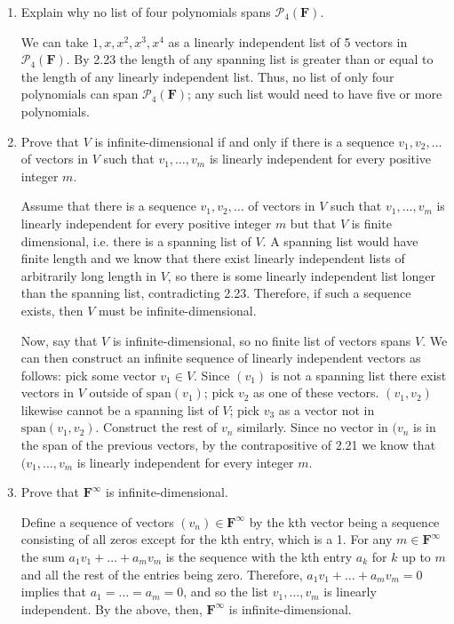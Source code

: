 \documentclass{book}
\begin{document}
\begin{enumerate}
\item Explain why no list of four polynomials spans \(\mathcal{P}_4(\textbf{F})\).

We can take \(1,x,x^2,x^3,x^4\) as a linearly independent list of 5 vectors in \(\mathcal{P}_4(\textbf{F})\).  By 2.23 the length of any spanning list is greater than or equal to the length of any linearly independent list.  Thus, no list of only four polynomials can span \(\mathcal{P}_4(\textbf{F})\); any such list would need to have five or more polynomials.

\item Prove that \(V\) is infinite-dimensional if and only if there is a sequence \(v_1,v_2,\dots\) of vectors in \(V\) such that \(v_1,\dots,v_m\) is linearly independent for every positive integer \(m\).

Assume that there is a sequence \(v_1,v_2,\dots\) of vectors in \(V\) such that \(v_1,\dots,v_m\) is linearly independent for every positive integer \(m\) but that \(V\) is finite dimensional, i.e. there is a spanning list of \(V\).  A spanning list would have finite length and we know that there exist linearly independent lists of arbitrarily long length in \(V\), so there is some linearly independent list longer than the spanning list, contradicting 2.23.  Therefore, if such a sequence exists, then \(V\) must be infinite-dimensional.

Now, say that \(V\) is infinite-dimensional, so no finite list of vectors spans \(V\).  We can then construct an infinite sequence of linearly independent vectors as follows: pick some vector \(v_1 \in V\).  Since \((v_1)\) is not a spanning list there exist vectors in \(V\) outside of \(\textrm{span}(v_1)\); pick \(v_2\) as one of these vectors.  \((v_1,v_2)\) likewise cannot be a spanning list of \(V\); pick \(v_3\) as a vector not in \(\textrm{span}(v_1,v_2)\).  Construct the rest of \(v_n\) similarly.  Since no vector in \((v_n\) is in the span of the previous vectors, by the contrapositive of 2.21 we know that \((v_1,\dots,v_m\) is linearly independent for every integer \(m\).

\item Prove that \(\textbf{F}^{\infty}\) is infinite-dimensional.

Define a sequence of vectors \((v_n) \in \textbf{F}^{\infty}\) by the kth vector being a sequence consisting of all zeros except for the kth entry, which is a 1.  For any \(m \in \textbf{F}^{\infty}\) the sum \(a_1v_1+\dots+a_mv_m\) is the sequence with the kth entry \(a_k\) for \(k\) up to \(m\) and all the rest of the entries being zero.  Therefore, \(a_1v_1+\dots+a_mv_m=0\) implies that \(a_1=\dots=a_m=0\), and so the list \(v_1,\dots,v_m\) is linearly independent.  By the above, then, \(\textbf{F}^{\infty}\) is infinite-dimensional.


\end{enumerate}
\end{document}
